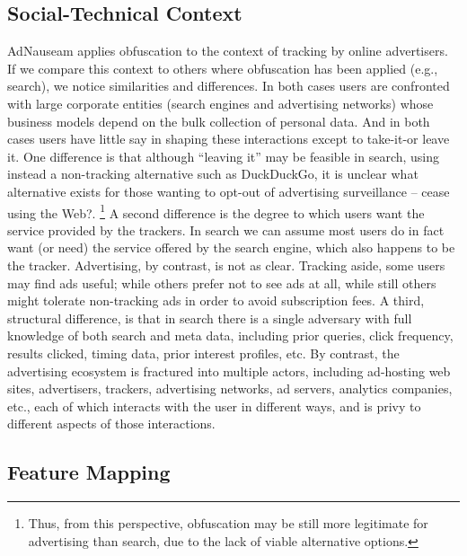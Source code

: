 \documentclass[conference]{IEEEtran}
\begin{document}
\subsection{Social-Technical Context}

AdNauseam applies obfuscation to the context of tracking by online advertisers. If we compare this context to others where obfuscation has been applied (e.g., search), we notice similarities and differences. In both cases users are confronted with large corporate entities (search engines and advertising networks) whose business models depend on the bulk collection of personal data. And in both cases users have little say in shaping these interactions except to take-it-or leave it. One difference is that although “leaving it” may be feasible in search, using instead a non-tracking alternative such as DuckDuckGo, it is unclear what alternative exists for those wanting to opt-out of advertising surveillance – cease using the Web?. \footnote{Thus, from this perspective, obfuscation may be still more legitimate for advertising than search, due to the lack of viable alternative options.} A second difference is the degree to which users want the service provided by the trackers. In search we can assume most users do in fact want (or need) the service offered by the search engine, which also happens to be the tracker. Advertising, by contrast, is not as clear. Tracking aside, some users may find ads useful; while others prefer not to see ads at all, while still others might tolerate non-tracking ads in order to avoid subscription fees. A third, structural difference, is that in search there is a single adversary with full knowledge of both search and meta data, including prior queries, click frequency, results clicked, timing data, prior interest profiles, etc. By contrast, the advertising ecosystem is fractured into multiple actors, including ad-hosting web sites, advertisers, trackers, advertising networks, ad servers, analytics companies, etc., each of which interacts with the user in different ways, and is privy to different aspects of those interactions.

\subsection{Feature Mapping}
\end{document}

